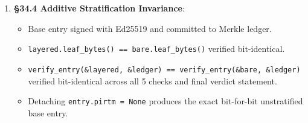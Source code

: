 \documentclass[
]{article}
\providecommand{\tightlist}{%
  \setlength{\itemsep}{0pt}\setlength{\parskip}{0pt}}
\begin{document}
\begin{enumerate}
  \begin{itemize}
  \tightlist
  \item
    \texttt{snapaddr}:
    \texttt{6b16a39b5e4751a8950d30e013c6bff7d1b0eaee91f8a8f49fee2d20ee546766}
  \item
    \texttt{prime\_index}: \texttt{2} (least prime \(\ge 2\))
  \item
    \texttt{contractivity}: \texttt{ContractivityReceipt} (domain:
    \texttt{lexlean-contractivity-v1}, norm: \([1, 6]\), status:
    \texttt{ACCEPT})
  \item
    \texttt{zeno\_finton}: \texttt{ZenoFinton::at(0)}
    (\(\kappa(0) = 1\))
  \end{itemize}
\item
  \textbf{§34.4 Additive Stratification Invariance}:

  \begin{itemize}
  \tightlist
  \item
    Base entry signed with Ed25519 and committed to Merkle ledger.
  \item
    \texttt{layered.leaf\_bytes()\ ==\ bare.leaf\_bytes()} verified
    bit-identical.
  \item
    \texttt{verify\_entry(\&layered,\ \&ledger)\ ==\ verify\_entry(\&bare,\ \&ledger)}
    verified bit-identical across all 5 checks and final verdict
    statement.
  \item
    Detaching \texttt{entry.pirtm\ =\ None} produces the exact
    bit-for-bit unstratified base entry.
  \end{itemize}
\end{enumerate}
\end{document}
